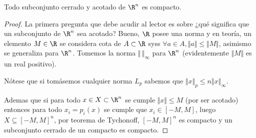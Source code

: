\documentclass[11pt,oneside,a4paper]{book}
\begin{document}
\begin{thm}
Todo subconjunto cerrado y acotado de $\R^n$ es compacto.
\end{thm}
\begin{proof}
La primera pregunta que debe acudir al lector es sobre ¿qué significa que un subconjunto de $\R^n$ sea acotado? Bueno, $\R$ posee una norma y en teoría, un elemento $M\in\R$ se considera cota de $A\subset\R$ syss $\forall a\in A, \Vert a\Vert\leq\Vert M\Vert$, asimismo se generaliza para $\R^n$. Tomemos la norma $\Vert\,\Vert_\infty$ para $\R^n$ (evidentemente $\Vert M\Vert$ es un real positivo).

Nótese que si tomásemos cualquier norma $L_p$ sabemos que $\Vert x\Vert_p\leq n\Vert x\Vert_\infty$.

Ademas que si para todo $x\in X\subset\R^n$ se cumple $\Vert x\Vert\leq M$ (por ser acotado) entonces para todo $x_i=p_i(x)$ se cumple que $x_i\in[-M,M]$, luego $X\subseteq[-M,M]^n$, por teorema de Tychonoff, $[-M,M]^n$ es compacto y un subconjunto cerrado de un compacto es compacto.
\end{proof}
\end{document}

